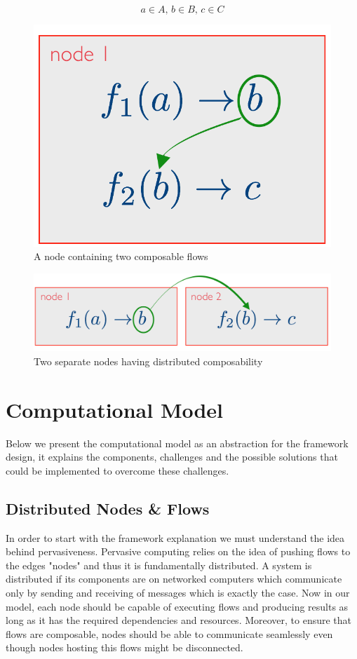 \[a \in A, \, b \in B, \, c \in C\]
\begin{figure}[H]
	\centering
	\includegraphics[scale=0.3]{images/local-compose.png} 
 	\caption{A node containing two composable flows}
	\label{fig:compose}
\end{figure}
\begin{figure}[H]
	\centering
	\includegraphics[scale=0.4]{images/distributed-compose.png}
	\caption{Two separate nodes having distributed composability}
	\label{fig:compose2}
\end{figure}


\section{Computational Model}

Below we present the computational model as an abstraction for the framework design, it explains the components, challenges and the possible solutions that could be implemented to overcome these challenges. 	

\subsection{Distributed Nodes \& Flows}
In order to start with the framework explanation we must understand the idea behind pervasiveness. Pervasive computing relies on the idea of pushing flows to the edges "nodes" and thus it is fundamentally distributed. A system is distributed if its components  are on networked computers which communicate only by sending and receiving of messages \cite{DSYS} which is exactly the case. Now in our model, each node should be capable of executing flows and producing results as long as it  has the required dependencies and resources. Moreover, to ensure that flows are composable, nodes should be able to communicate seamlessly even though nodes hosting this flows might be disconnected.


